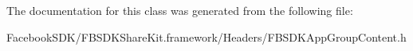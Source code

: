 The documentation for this class was generated from the following file\-:\begin{DoxyCompactItemize}
\item 
Facebook\-S\-D\-K/\-F\-B\-S\-D\-K\-Share\-Kit.\-framework/\-Headers/F\-B\-S\-D\-K\-App\-Group\-Content.\-h\end{DoxyCompactItemize}
